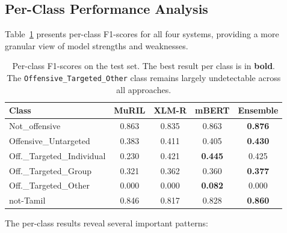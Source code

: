 \documentclass[12pt, a4paper]{article}
\begin{document}
\subsection{Per-Class Performance Analysis}

Table~\ref{tab:perclass_f1} presents per-class F1-scores for all four systems, providing a more granular view of model strengths and weaknesses.

\begin{table}[!htbp]
\centering
\caption{Per-class F1-scores on the test set. The best result per class is in \textbf{bold}. The \texttt{Offensive\_Targeted\_Other} class remains largely undetectable across all approaches.}
\label{tab:perclass_f1}
\begin{tabular}{l c c c c}
\toprule
\textbf{Class} & \textbf{MuRIL} & \textbf{XLM-R} & \textbf{mBERT} & \textbf{Ensemble} \\
\midrule
Not\_offensive              & 0.863 & 0.835 & 0.863 & \textbf{0.876} \\
Offensive\_Untargeted       & 0.383 & 0.411 & 0.405 & \textbf{0.430} \\
Off.\_Targeted\_Individual  & 0.230 & 0.421 & \textbf{0.445} & 0.425 \\
Off.\_Targeted\_Group       & 0.321 & 0.362 & 0.360 & \textbf{0.377} \\
Off.\_Targeted\_Other       & 0.000 & 0.000 & \textbf{0.082} & 0.000 \\
not-Tamil                   & 0.846 & 0.817 & 0.828 & \textbf{0.860} \\
\bottomrule
\end{tabular}
\end{table}

\vspace{1em}

The per-class results reveal several important patterns:
\end{document}
